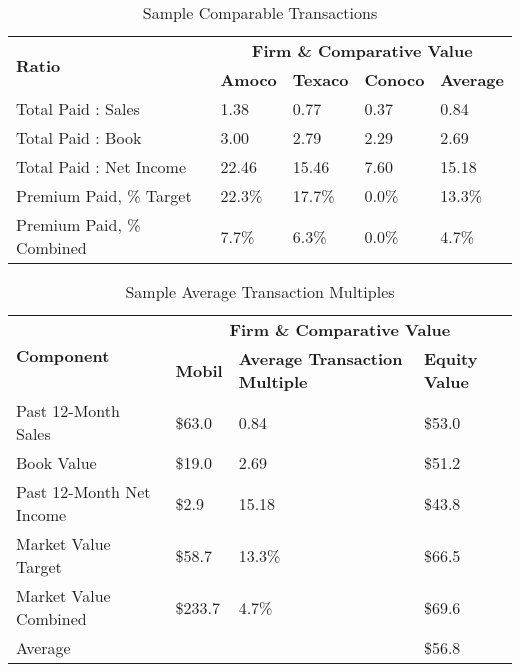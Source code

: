 \documentclass[11pt, english]{article}
\begin{document}
	\begin{table}[h]
		\scriptsize
		\renewcommand{\arraystretch}{1.25}
	\begin{center}
	\begin{tabular}{p{4cm}|p{2cm}p{2cm}p{2cm}|p{2cm}}
		\multirow{2}{*}{\textbf{Ratio}} & \multicolumn{4}{c}{\textbf{Firm \& Comparative Value}}\\
		\cline{2-5}
		& \textbf{Amoco} & \textbf{Texaco} & \textbf{Conoco} & \textbf{Average}\\
		\hline
		Total Paid : Sales & 1.38 & 0.77 & 0.37 & 0.84\\
		Total Paid : Book & 3.00 & 2.79 & 2.29 & 2.69\\
		Total Paid : Net Income & 22.46 & 15.46 & 7.60 & 15.18\\
		Premium Paid, \% Target & 22.3\% & 17.7\% & 0.0\% & 13.3\%\\
		Premium Paid, \% Combined & 7.7\% & 6.3\% & 0.0\% & 4.7\%\\
		\hline
	\end{tabular}
		\caption{Sample Comparable Transactions}
	\end{center}
	\end{table}

	\begin{table}[h]
                \scriptsize
                \renewcommand{\arraystretch}{1.25}
        \begin{center}
	\begin{tabular}{p{3.5cm}|p{2cm}p{4.5cm}|p{2cm}}
		\multirow{2}{*}{\textbf{Component}} & \multicolumn{3}{c}{\textbf{Firm \& Comparative Value}}\\
		\cline{2-4}
		& \textbf{Mobil} & \textbf{Average Transaction Multiple} & \textbf{Equity Value}\\
		\hline
		Past 12-Month Sales & \$63.0 & 0.84 & \$53.0\\
		Book Value & \$19.0 & 2.69 & \$51.2\\
		Past 12-Month Net Income & \$2.9 & 15.18 & \$43.8\\
		Market Value Target & \$58.7 & 13.3\% & \$66.5\\
		Market Value Combined & \$233.7 & 4.7\% & \$69.6\\
		\cline{4-4}
		Average & \multicolumn{2}{c|}{} & \$56.8\\
		\hline
	\end{tabular}
                \caption{Sample Average Transaction Multiples}
        \end{center}
        \end{table}
\end{document}
